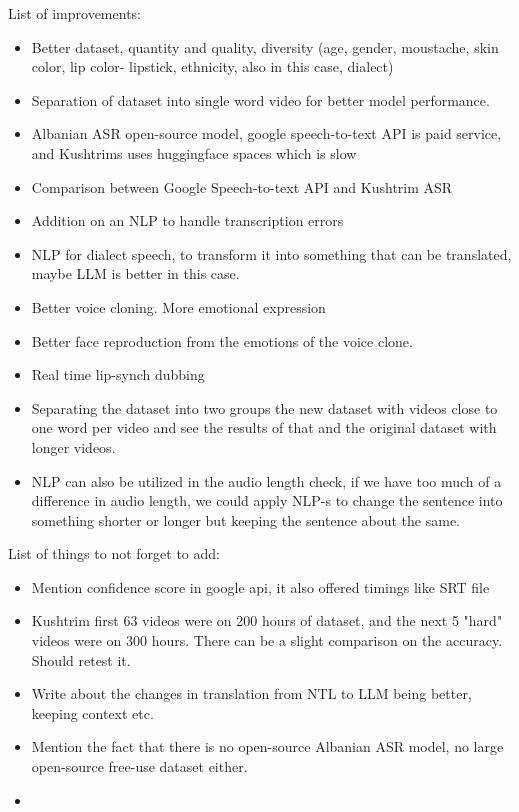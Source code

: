 \documentclass[12pt]{article}
\begin{document}
List of improvements:
\begin{itemize}
    \item Better dataset, quantity and quality, diversity (age, gender, moustache, skin color, lip color- lipstick, ethnicity, also in this case, dialect)
    \item Separation of dataset into single word video for better model performance.
    \item Albanian ASR open-source model, google speech-to-text API is paid service, and Kushtrims uses huggingface spaces which is slow
    \item Comparison between Google Speech-to-text API and Kushtrim ASR
    \item Addition on an NLP to handle transcription errors
    \item NLP for dialect speech, to transform it into something that can be translated, maybe LLM is better in this case.
    \item Better voice cloning. More emotional expression
    \item Better face reproduction from the emotions of the voice clone.
    \item Real time lip-synch dubbing
    \item Separating the dataset into two groups the new dataset with videos close to one word per video and see the results of that and the original dataset with longer videos. 
    \item NLP can also be utilized in the audio length check, if we have too much of a difference in audio length, we could apply NLP-s to change the sentence into something shorter or longer but keeping the sentence about the same.
\end{itemize}

List of things to not forget to add:
\begin{itemize}
    \item Mention confidence score in google api, it also offered timings like SRT file
    \item Kushtrim first 63 videos were on 200 hours of dataset, and the next 5 "hard" videos were on 300 hours. There can be a slight comparison on the accuracy. Should retest it.
    \item Write about the changes in translation from NTL to LLM being better, keeping context etc.
    \item Mention the fact that there is no open-source Albanian ASR model, no large open-source free-use dataset either. 
    \item 
\end{itemize}



\end{document}
